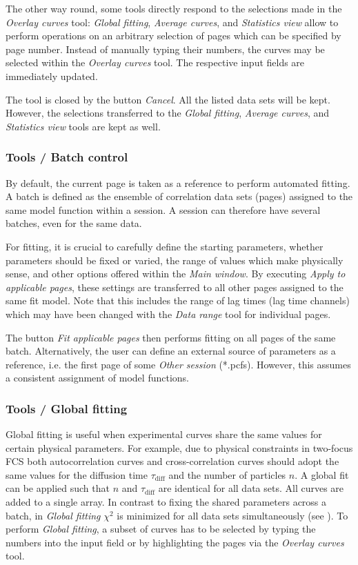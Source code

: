 The other way round, some tools directly respond to the selections made in the \textit{Overlay curves} tool: \textit{Global fitting}, \textit{Average curves}, and \textit{Statistics view} allow to perform operations on an arbitrary selection of pages which can be specified by page number. Instead of manually typing their numbers, the curves may be selected within the \textit{Overlay curves} tool. The respective input fields are immediately updated.

The tool is closed by the button \textit{Cancel}. All the listed data sets will be kept. However, the selections transferred to the \textit{Global fitting}, \textit{Average curves}, and \textit{Statistics view} tools are kept as well.

\subsubsection{Tools / Batch control}
\label{sec:menub.tools.batch}
By default, the current page is taken as a reference to perform automated fitting. A batch is defined as the ensemble of correlation data sets (pages) assigned to the same model function within a session. A session can therefore have several batches, even for the same data. 

For fitting, it is crucial to carefully define the starting parameters, whether parameters should be fixed or varied, the range of values which make physically sense, and other options offered within the \textit{Main window}. By executing \textit{Apply to applicable pages}, these settings are transferred to all other pages assigned to the same fit model. Note that this includes the range of lag times (lag time channels) which may have been changed with the \textit{Data range }tool for individual pages.

The button \textit{Fit applicable pages} then performs fitting on all pages of the same batch. Alternatively, the user can define an external source of parameters as a reference, i.e. the first page of some \textit{Other session} (*.pcfs). However, this assumes a consistent assignment of model functions.

\subsubsection{Tools / Global fitting}
\label{sec:menub.tools.globa}
Global fitting is useful when experimental curves share the same values for certain physical parameters. For example, due to physical constraints in two-focus FCS both autocorrelation curves and  cross-correlation curves should adopt the same values for the diffusion time $\tau_\mathrm{diff}$ and the number of particles $n$. A global fit can be applied such that $n$ and $\tau_\mathrm{diff}$ are identical for all data sets. All curves are added to a single array. In contrast to fixing the shared parameters across a batch, in \textit{Global fitting} $\chi^2$  is minimized for all data sets simultaneously (see ). To perform \textit{Global fitting}, a subset of curves has to be selected by typing the numbers into the input field or by highlighting the pages via the \textit{Overlay curves} tool. 

